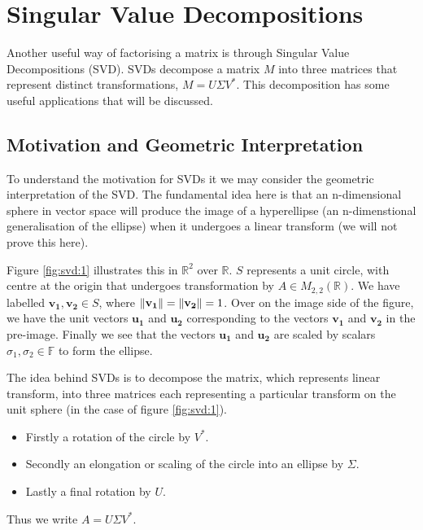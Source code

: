 \documentclass[12pt,reqno,twoside,titlepage]{article}
\theoremstyle{definition}
\begin{document}
\section{Singular Value Decompositions}
\label{sec:svd}
Another useful way of factorising a matrix is through Singular Value Decompositions (SVD).
SVDs decompose a matrix $M$ into three matrices that represent distinct transformations, $M = U \Sigma V^*$.
This decomposition has some useful applications that will be discussed.

\subsection{Motivation and Geometric Interpretation}
\label{sec:svd:1}
To understand the motivation for SVDs it we may consider the geometric interpretation of the SVD.
The fundamental idea here is that an n-dimensional sphere in vector space will produce the image of a hyperellipse (an n-dimenstional generalisation of the ellipse) when it undergoes a linear transform (we will not prove this here).

Figure \ref{fig:svd:1} illustrates this in $\mathbb{R}^2$ over $\mathbb{R}$.
$S$ represents a unit circle, with centre at the origin that undergoes transformation by $A \in M_{2, 2}(\mathbb{R})$.
We have labelled $\mathbf{v_1}, \mathbf{v_2} \in S$, where $\left\lVert\mathbf{v_1}\right\rVert = \left\lVert\mathbf{v_2}\right\rVert = 1$.
Over on the image side of the figure, we have the unit vectors $\mathbf{u_1}$ and $\mathbf{u_2}$ corresponding to the vectors $\mathbf{v_1}$ and $\mathbf{v_2}$ in the pre-image.
Finally we see that the vectors $\mathbf{u_1}$ and $\mathbf{u_2}$ are scaled by scalars $\sigma_1, \sigma_2 \in \mathbb{F}$ to form the ellipse.


The idea behind SVDs is to decompose the matrix, which  represents linear transform, into three matrices each representing a particular transform on the unit sphere (in the case of figure \ref{fig:svd:1}).

\begin{itemize}
\item Firstly a rotation of the circle by $V^*$.
\item Secondly an elongation or scaling of the circle into an ellipse by $\Sigma$.
\item Lastly a final rotation by $U$.
\end{itemize}

Thus we write $A = U \Sigma V^*$.
\end{document}
